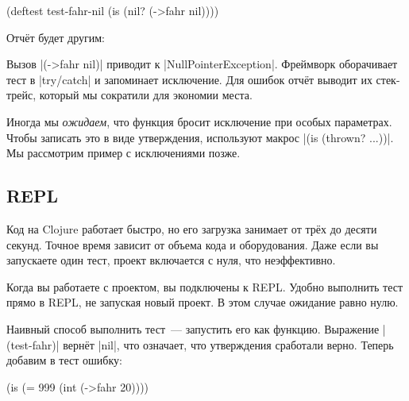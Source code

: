 \begin{english}
  \begin{clojure}
(deftest test-fahr-nil
  (is (nil? (->fahr nil))))
  \end{clojure}
\end{english}

Отчёт будет другим:

\begin{english}
\end{english}


Вызов \spverb|(->fahr nil)| приводит к \spverb|NullPointerException|. Фреймворк
оборачивает тест в \spverb|try/catch| и запоминает исключение. Для ошибок отчёт
выводит их стек-трейс, который мы сократили для экономии места.

Иногда мы \emph{ожидаем}, что функция бросит исключение при особых
параметрах. Чтобы записать это в виде утверждения, используют макрос
\spverb|(is (thrown? ...))|. Мы рассмотрим пример с исключениями позже.

\subsection{REPL}


Код на Clojure работает быстро, но его загрузка занимает от трёх до десяти
секунд. Точное время зависит от объема кода и оборудования. Даже если вы
запускаете один тест, проект включается с нуля, что неэффективно.

Когда вы работаете с проектом, вы подключены к REPL. Удобно выполнить тест прямо
в REPL, не запуская новый проект. В этом случае ожидание равно нулю.

Наивный способ выполнить тест~--- запустить его как функцию. Выражение
\spverb|(test-fahr)| вернёт \spverb|nil|, что означает, что утверждения
сработали верно. Теперь добавим в тест ошибку:

\begin{english}
  \begin{clojure}
(is (= 999 (int (->fahr 20))))
  \end{clojure}
\end{english}

